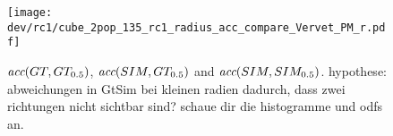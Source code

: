 \begin{figure}[!p]
\centering
\texttt{[image: dev/rc1/cube\_2pop\_135\_rc1\_radius\_acc\_compare\_Vervet\_PM\_r.pdf]}
\caption[sim acc]{ $\textit{acc}{}(GT,GT_{0.5})$, $\textit{acc}{}(SIM,GT_{0.5})$ and $\textit{acc}{}(SIM,SIM_{0.5})$. hypothese: abweichungen in GtSim bei kleinen radien dadurch, dass zwei richtungen nicht sichtbar sind? schaue dir die histogramme und odfs an. }
\label{fig:accVervetPMr}
\end{figure}
% 
